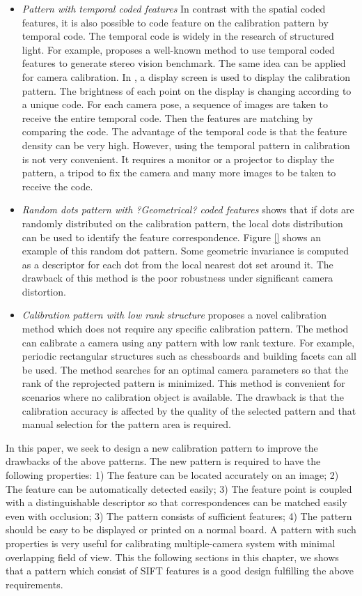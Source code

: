 \documentclass{report}
\begin{document}
\begin{itemize}
	\item \textit{Pattern with temporal coded features} In contrast with the spatial coded features, it is also possible to code feature on the calibration pattern by temporal code. The temporal code is widely in the research of structured light. For example, \cite{} proposes a well-known method to use temporal coded features to generate stereo vision benchmark. The same idea can be applied for camera calibration. In \cite{}, a display screen is used to display the calibration pattern. The brightness of each point on the display is changing according to a unique code. For each camera pose, a sequence of images are taken to receive the entire temporal code. Then the features are matching by comparing the code. The advantage of the temporal code is that the feature density can be very high. However, using the temporal pattern in calibration is not very convenient. It requires a monitor or a projector to display the pattern, a tripod to fix the camera and many more images to be taken to receive the code. 
	\item \textit{Random dots pattern with ?Geometrical? coded features} \cite{oyamadasingle} shows that if dots are randomly distributed on the calibration pattern, the local dots distribution can be used to identify the feature correspondence. Figure \ref{} shows an example of this random dot pattern. Some geometric invariance is computed as a descriptor for each dot from the local nearest dot set around it. The drawback of this method is the poor robustness under significant camera distortion. 
	\item \textit{Calibration pattern with low rank structure} \cite{} proposes a novel calibration method which does not require any specific calibration pattern. The method can calibrate a camera using any pattern with low rank texture. For example, periodic rectangular structures such as chessboards and building facets can all be used. The method searches for an optimal camera parameters so that the rank of the reprojected pattern is minimized. This method is convenient for scenarios where no calibration object is available. The drawback is that the calibration accuracy is affected by the quality of the selected pattern and that manual selection for the pattern area is required. 
\end{itemize}

In this paper, we seek to design a new calibration pattern to improve the drawbacks of the above patterns. The new pattern is required to have the following properties: 1) The feature can be located accurately on an image; 2) The feature can be automatically detected easily; 3) The feature point is coupled with a distinguishable descriptor so that correspondences can be matched easily even with occlusion; 3) The pattern consists of sufficient features; 4) The pattern should be easy to be displayed or printed on a normal board. A pattern with such properties is very useful for calibrating multiple-camera system with minimal overlapping field of view. This the following sections in this chapter, we shows that a pattern which consist of SIFT features \cite{lowe2004distinctive} is a good design fulfilling the above requirements. 
\end{document}
